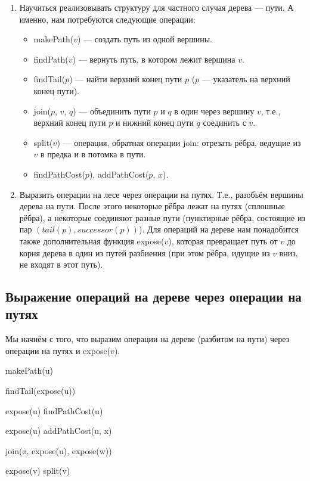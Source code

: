 \begin{enumerate}
    \item Научиться реализовывать структуру для частного случая дерева --- пути. А именно, нам потребуются следующие операции:
        \begin{itemize}
            \item makePath($v$) --- создать путь из одной вершины.
            \item findPath($v$) --- вернуть путь, в котором лежит вершина $v$.
            \item findTail($p$) --- найти верхний конец пути $p$ ($p$ --- указатель на верхний конец пути). 
            \item join($p$, $v$, $q$) --- объединить пути $p$ и $q$ в один через вершину $v$, т.е., верхний конец пути $p$ и нижний конец пути $q$ соединить с $v$.
            \item split($v$) --- операция, обратная операции join: отрезать рёбра, ведущие из $v$ в предка и в потомка в пути.
            \item findPathCost($p$), addPathCost($p$, $x$).
        \end{itemize}
    \item Выразить операции на лесе через операции на путях. Т.е., разобьём вершины дерева на пути. После этого некоторые рёбра лежат на путях (сплошные рёбра), а некоторые соединяют разные пути (пунктирные рёбра, состоящие из пар $(tail(p), successor(p))$). Для операций на дереве нам понадобится также дополнительная функция expose($v$), которая превращает путь от $v$ до корня дерева в один из путей разбиения (при этом рёбра, идущие из $v$ вниз, не входят в этот путь).
\end{enumerate}

\subsection{Выражение операций на дереве через операции на путях}

Мы начнём с того, что выразим операции на дереве (разбитом на пути) через операции на путях и expose($v$).

\begin{algorithmic}[1]
		\State makePath(u)
	\EndProcedure

		\State findTail(expose(u))
	\EndProcedure

		\State expose(u)
		\State findPathCost(u)
	\EndProcedure

		\State expose(u)
		\State addPathCost(u, x)
	\EndProcedure

		\State join(\o, expose(u), expose(w))
	\EndProcedure

		\State expose(v)
		\State split(v)
	\EndProcedure

\end{algorithmic}

